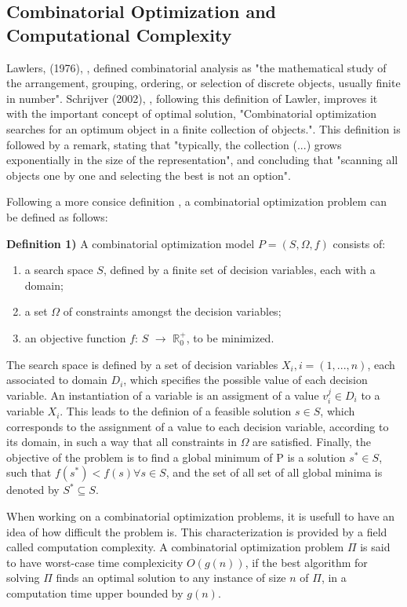 \subsection{Combinatorial Optimization and Computational Complexity}
\label{sec:cop_and_cc}

Lawlers, (1976), \cite{COP_book_lawler}, defined combinatorial analysis as "the mathematical study of the arrangement,
grouping, ordering, or selection of discrete objects, usually finite in number". 
Schrijver (2002), \cite{COP_book}, following this definition of Lawler, improves it with the important concept of optimal solution,
"Combinatorial optimization searches for an optimum object in a finite collection of objects.". This definition is followed by a remark, 
stating that "typically, the collection (...) grows exponentially in the size of the representation",
and concluding that "scanning all objects one by one and selecting the best is not an option".

Following a more consice definition \cite{aco_overview_advances}, a combinatorial optimization problem can be defined as follows:

\textbf{Definition 1)}  A combinatorial optimization model $P = (S,\Omega, f)$ consists of:
\begin{enumerate}
  \item a search space $S$, defined by a finite set of decision variables, each with a domain;
  \item a set $\Omega$ of constraints amongst the decision variables;
  \item an objective function $f$: $S$ $\rightarrow$ $\mathbb{R}_{0}^{+}$, to be minimized.
\end{enumerate}

The search space is defined by a set of decision variables $X_{i}, i = (1,...,n)$, 
each associated to domain $D_{i}$, which specifies the possible value of each decision variable. 
An instantiation of a variable is an assigment of a value $v_{i}^{j} \in D_{i}$
to a variable $X_{i}$. This leads to the definion of a feasible solution $s \in S$,
which corresponds to the assignment of a value to each decision variable, according to its domain, 
in such a way that all constraints in $\Omega$ are satisfied.   
Finally, the objective of the problem is to find a global minimum of P is a solution $s^{*} \in S$, 
such that $f(s^{*}) < f(s) \forall s \in S$, and the set of all set of all global minima is denoted by $S^{*} \subseteq S$.

When working on a combinatorial optimization problems, it is usefull to have an idea of how difficult the problem is.
This characterization is provided by a field called computation complexity. 
A combinatorial optimization problem $\Pi$ is said to have worst-case time complexicity  $O(g(n))$, if the best algorithm 
for solving $\Pi$ finds an optimal solution to any instance of size $n$ of $\Pi$,
in a computation time upper bounded by $g(n)$.

